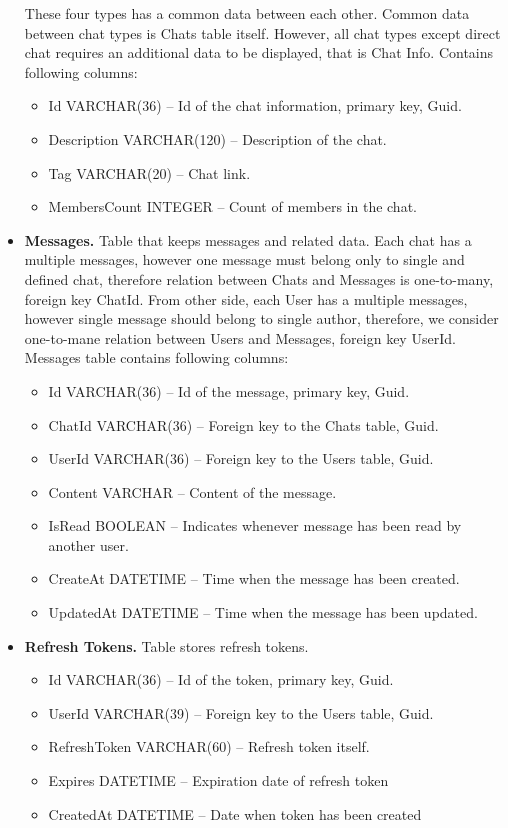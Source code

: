 \begin{itemize}
    These four types has a common data between each other.
    Common data between chat types is Chats table itself.
    However, all chat types except direct chat requires an additional data to be displayed, that is Chat Info.
    Contains following columns:
    \begin{itemize}
        \item Id VARCHAR(36) -- Id of the chat information, primary key, Guid.
        \item Description VARCHAR(120) -- Description of the chat.
        \item Tag VARCHAR(20) -- Chat link.
        \item MembersCount INTEGER -- Count of members in the chat.
    \end{itemize}
    \item \textbf{Messages.} Table that keeps messages and related data.
    Each chat has a multiple messages, however one message must belong only to single and defined chat,
    therefore relation between Chats and Messages is one-to-many, foreign key ChatId.
    From other side, each User has a multiple messages, however single message should belong to single author,
    therefore, we consider one-to-mane relation between Users and Messages, foreign key UserId.
    Messages table contains following columns:
    \begin{itemize}
        \item Id VARCHAR(36) -- Id of the message, primary key, Guid.
        \item ChatId VARCHAR(36) -- Foreign key to the Chats table, Guid.
        \item UserId VARCHAR(36) -- Foreign key to the Users table, Guid.
        \item Content VARCHAR -- Content of the message.
        \item IsRead BOOLEAN -- Indicates whenever message has been read by another user.
        \item CreateAt DATETIME -- Time when the message has been created.
        \item UpdatedAt DATETIME -- Time when the message has been updated.
    \end{itemize}
    \item \textbf{Refresh Tokens.} Table stores refresh tokens.
    \begin{itemize}
        \item Id VARCHAR(36) -- Id of the token, primary key, Guid.
        \item UserId VARCHAR(39) -- Foreign key to the Users table, Guid.
        \item RefreshToken VARCHAR(60) -- Refresh token itself.
        \item Expires DATETIME -- Expiration date of refresh token
        \item CreatedAt DATETIME -- Date when token has been created
    \end{itemize}
\end{itemize}

